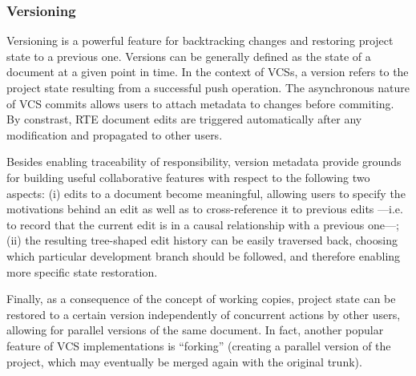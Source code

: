 \documentclass{sig-alternate}
\begin{document}
\subsubsection{Versioning}\label{subsec:versioning}
Versioning is a powerful feature for backtracking changes and restoring project state to a
previous one. Versions can be generally defined as the state of a document at a given point in time.
In the context of VCSs, a version refers to the project state resulting from a successful push
operation.
The asynchronous nature of VCS commits allows users to attach metadata to changes before
commiting. By constrast, RTE document edits are triggered automatically after any modification and
propagated to other users.

Besides enabling traceability of responsibility, version metadata provide grounds for building useful
collaborative features with respect to the following two aspects: (i) edits to a document become
meaningful, allowing users to specify the motivations behind an edit as well as to cross-reference
it to previous edits ---i.e. to record that the current edit is in a causal relationship with a
previous one---; (ii) the resulting tree-shaped edit history can be easily traversed back, choosing
which particular development branch should be followed, and therefore enabling more specific
state restoration.

Finally, as a consequence of the concept of working copies, project state can be restored
to a certain version independently of concurrent actions by other users, allowing for parallel
versions of the same document. In fact, another popular feature of VCS implementations
is ``forking'' (creating a parallel version of the project, which may eventually be merged
again with the original trunk).


\end{document}
